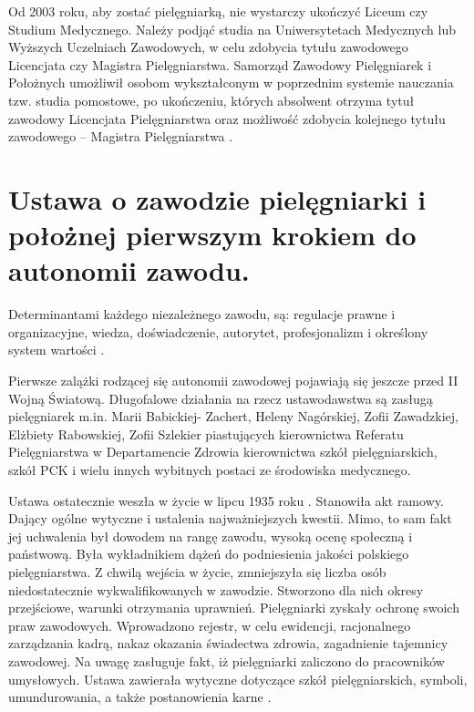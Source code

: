 \documentclass[a4paper,12pt,twoside,openany]{report}
\begin{document}
Od 2003 roku, aby zostać pielęgniarką, nie wystarczy ukończyć Liceum czy Studium Medycznego. Należy podjąć studia na Uniwersytetach Medycznych lub Wyższych Uczelniach Zawodowych, w celu zdobycia tytułu zawodowego Licencjata czy Magistra Pielęgniarstwa. Samorząd Zawodowy Pielęgniarek i Położnych umożliwił osobom wykształconym w poprzednim systemie nauczania tzw. studia pomostowe, po ukończeniu, których absolwent otrzyma tytuł zawodowy Licencjata Pielęgniarstwa oraz możliwość zdobycia kolejnego tytułu zawodowego – Magistra Pielęgniarstwa \cite{model}.

\section{Ustawa o zawodzie pielęgniarki i położnej pierwszym krokiem do autonomii zawodu.}
Determinantami każdego niezależnego zawodu, są: regulacje prawne i organizacyjne, wiedza, doświadczenie, autorytet, profesjonalizm i określony system wartości  \cite{deter}.

Pierwsze zalążki rodzącej się autonomii zawodowej pojawiają się jeszcze przed II Wojną Światową. Długofalowe działania na rzecz ustawodawstwa są zasługą pielęgniarek m.in.  Marii Babickiej- Zachert, Heleny Nagórskiej, Zofii Zawadzkiej, Elżbiety Rabowskiej, Zofii Szlekier piastujących kierownictwa Referatu Pielęgniarstwa w Departamencie Zdrowia kierownictwa szkół pielęgniarskich, szkół PCK i wielu innych wybitnych postaci ze środowiska medycznego.

Ustawa ostatecznie weszła w życie w lipcu 1935 roku \cite{usta}. Stanowiła akt ramowy. Dający ogólne wytyczne i ustalenia najważniejszych kwestii. Mimo, to sam fakt jej uchwalenia był dowodem na rangę zawodu, wysoką ocenę społeczną i państwową. Była wykładnikiem dążeń do podniesienia jakości polskiego pielęgniarstwa. Z chwilą wejścia w życie, zmniejszyła się liczba osób niedostatecznie wykwalifikowanych w zawodzie. Stworzono dla nich okresy przejściowe, warunki otrzymania uprawnień. Pielęgniarki zyskały ochronę swoich praw zawodowych. Wprowadzono rejestr, w celu ewidencji, racjonalnego zarządzania kadrą, nakaz okazania świadectwa zdrowia, zagadnienie tajemnicy zawodowej. Na uwagę zasługuje fakt, iż pielęgniarki zaliczono do pracowników umysłowych. Ustawa zawierała wytyczne dotyczące szkół pielęgniarskich, symboli, umundurowania, a także postanowienia karne \cite{1935}.
\end{document}
